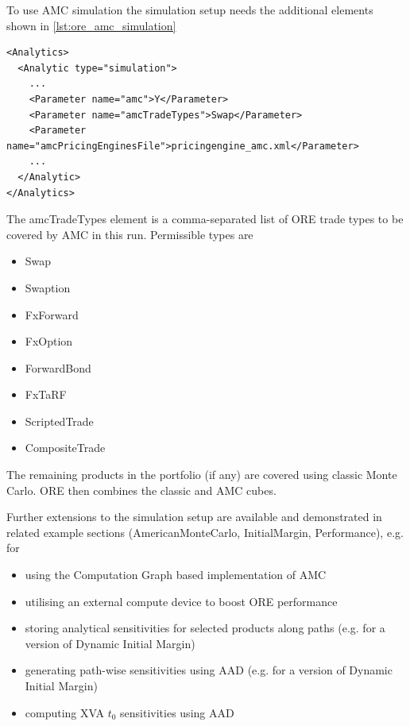 \medskip
To use  AMC simulation the simulation setup needs the additional elements shown in \ref{lst:ore_amc_simulation}

\begin{listing}[H]
\begin{verbatim}
<Analytics>
  <Analytic type="simulation">
    ...
    <Parameter name="amc">Y</Parameter>
    <Parameter name="amcTradeTypes">Swap</Parameter>
    <Parameter name="amcPricingEnginesFile">pricingengine_amc.xml</Parameter>
    ...
  </Analytic>
</Analytics>
\end{verbatim}
\caption{ORE analytic: simulation}
\label{lst:ore_amc_simulation}
\end{listing}

The amcTradeTypes element is a comma-separated list of ORE trade types to be covered by AMC in this run. Permissible types are
\begin{itemize}
\item Swap
\item Swaption
\item FxForward
\item FxOption
\item ForwardBond
\item FxTaRF
\item ScriptedTrade
\item CompositeTrade
\end{itemize}
The remaining products in the portfolio (if any) are covered using classic Monte Carlo.
ORE then combines the classic and AMC cubes.

Further extensions to the simulation setup are available and demonstrated in related example sections (AmericanMonteCarlo,
InitialMargin, Performance), e.g. for
\begin{itemize}
\item using the Computation Graph based implementation of AMC
\item utilising an external compute device to boost ORE performance
\item storing analytical sensitivities for selected products along paths (e.g. for a version of Dynamic Initial Margin)
\item generating path-wise sensitivities using AAD  (e.g. for a version of Dynamic Initial Margin)
\item computing XVA $t_0$ sensitivities using AAD
\end{itemize}

